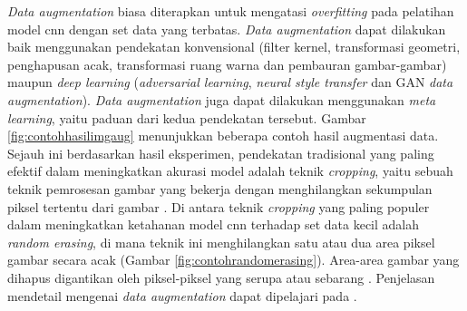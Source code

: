 \textit{Data augmentation} biasa diterapkan untuk mengatasi \textit{overfitting} pada pelatihan model \acrshort{cnn} dengan set data yang terbatas. \textit{Data augmentation} dapat dilakukan baik menggunakan pendekatan konvensional (filter kernel, transformasi geometri, penghapusan acak, transformasi ruang warna dan pembauran gambar-gambar) maupun \textit{deep learning} (\textit{adversarial learning}, \textit{neural style transfer} dan GAN \textit{data augmentation}). \textit{Data augmentation} juga dapat dilakukan menggunakan \textit{meta learning}, yaitu paduan dari kedua pendekatan tersebut. Gambar \ref{fig:contohhasilimgaug} menunjukkan beberapa contoh hasil augmentasi data. Sejauh ini berdasarkan hasil eksperimen, pendekatan tradisional yang paling efektif dalam meningkatkan akurasi model adalah teknik \textit{cropping}, yaitu sebuah teknik pemrosesan gambar yang bekerja dengan menghilangkan sekumpulan piksel tertentu dari gambar . Di antara teknik \textit{cropping} yang paling populer dalam meningkatkan ketahanan model \acrshort{cnn} terhadap set data kecil adalah \textit{random erasing}, di mana teknik ini menghilangkan satu atau dua area piksel gambar secara acak (Gambar \ref{fig:contohrandomerasing}). Area-area gambar yang dihapus digantikan oleh piksel-piksel yang serupa atau sebarang . Penjelasan mendetail mengenai \textit{data augmentation} dapat dipelajari pada .

